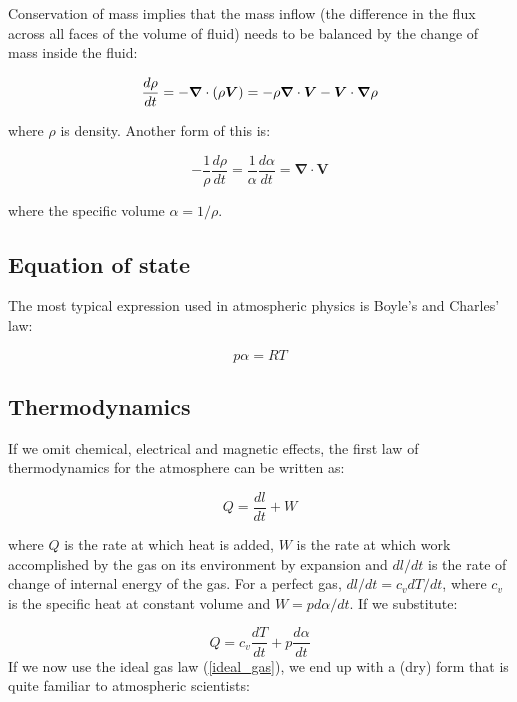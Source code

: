 Conservation of mass implies that the mass inflow (the difference in the flux across all faces of the volume of fluid) needs to be balanced by the change of mass inside the fluid:

\begin{equation}
	\frac{d \rho}{dt} =  -\bm{\nabla} \cdot (\rho \bm{V}) = - \rho \bm{\nabla} \cdot {\bm{V} }  -\bm{V} \cdot \mbox{\boldmath $\nabla$}{\rho}
\end{equation}

where $\rho$ is density. Another form of this is:

\begin{equation}
	-\frac{1}{\rho} \frac{d \rho}{dt} =   \frac{1}{\alpha} \frac{d \alpha}{dt}     = \bm{\nabla} \cdot  \bm{V} 
\end{equation}


where the specific volume $\alpha = 1/\rho$.

\subsection{Equation of state}

The most typical expression used in atmospheric physics is Boyle's and Charles' law:

\begin{equation}
	p\alpha=RT
	\label{ideal_gas}
\end{equation}


\subsection{Thermodynamics}

If we omit chemical, electrical and magnetic effects, the first law of thermodynamics for the atmosphere can be written as:

\begin{equation}
	Q=\frac{dl}{dt} + W
\end{equation}

where $Q$ is the rate at which heat is added, $W$ is the rate at which work accomplished by the gas on its environment by expansion and $dl/dt$ is the rate of change of internal energy of the gas. For a perfect gas, $dl/dt=c_vdT/dt$, where $c_v$ is the specific heat at constant volume and $W=p d\alpha/dt$. If we substitute:

 \begin{equation}
 	Q= c_v \frac{dT}{dt} + p\frac{d\alpha}{dt} 
 \end{equation}
If we now use the ideal gas law (\ref{ideal_gas}), we end up with a (dry) form that is quite familiar to atmospheric scientists:

